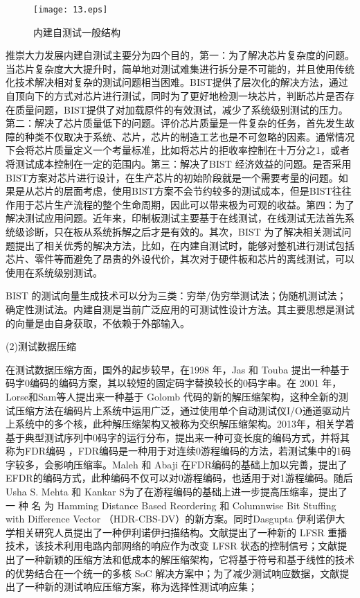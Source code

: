 \begin{figure}[H]
  \centering
  \texttt{[image: 13.eps]}
  \caption{内建自测试一般结构}\label{13}
     \end{figure}

推崇大力发展内建自测试主要分为四个目的，第一：为了解决芯片复杂度的问题。当芯片复杂度大大提升时，简单地对测试难集进行拆分是不可能的，并且使用传统化技术解决相对复杂的测试问题相当困难。BIST提供了层次化的解决方法，通过自顶向下的方式对芯片进行测试，同时为了更好地检测一块芯片，判断芯片是否存在质量问题，BIST提供了对加载原件的有效测试，减少了系统级别测试的压力。第二：解决了芯片质量低下的问题。评价芯片质量是一件复杂的任务，首先发生故障的种类不仅取决于系统、芯片，芯片的制造工艺也是不可忽略的因素。通常情况下会将芯片质量定义一个考量标准，比如将芯片的拒收率控制在十万分之1，或者将测试成本控制在一定的范围内。第三：解决了BIST 经济效益的问题。是否采用BIST方案对芯片进行设计，在生产芯片的初始阶段就是一个需要考量的问题。如果是从芯片的层面考虑，使用BIST方案不会节约较多的测试成本，但是BIST往往作用于芯片生产流程的整个生命周期，因此可以带来极为可观的收益。第四：为了解决测试应用问题。近年来，印制板测试主要基于在线测试，在线测试无法首先系统级诊断，只在板从系统拆解之后才是有效的。其次，BIST 为了解决相关测试问题提出了相关优秀的解决方法，比如，在内建自测试时，能够对整机进行测试包括芯片、零件等而避免了昂贵的外设代价，其次对于硬件板和芯片的离线测试，可以使用在系统级别测试。

BIST 的测试向量生成技术可以分为三类：穷举/伪穷举测试法；伪随机测试法；确定性测试法。内建自测是当前广泛应用的可测试性设计方法。其主要思想是测试的向量是由自身获取，不依赖于外部输入\cite{35}。

(2)测试数据压缩

在测试数据压缩方面，国外的起步较早，在1998 年，Jas 和 Touba 提出一种基于码字0编码的编码方案\cite{39}，其以较短的固定码字替换较长的0码字串。在 2001 年，Lorse和Sam等人提出来一种基于 Golomb 代码的新的解压缩架构，这种全新的测试压缩方法在编码片上系统中运用广泛，通过使用单个自动测试仪I/O通道驱动片上系统中的多个核，此种解压缩架构又被称为交织解压缩架构\cite{40}。2013年，相关学着基于典型测试序列中0码字的运行分布，提出来一种可变长度的编码方式，并将其称为FDR编码
\cite{41}，FDR编码是一种用于对连续0游程编码的方法，若测试集中的1码字较多，会影响压缩率。Maleh 和 Abaji 在FDR编码的基础上加以完善，提出了EFDR\cite{42}的编码方式，此种编码不仅可以对0游程编码，也适用于对1游程编码。随后Usha S. Mehta 和 Kankar S为了在游程编码的基础上进一步提高压缩率，提出了一 种 名 为 Hamming Distance Based Reordering 和 Columnwise Bit Stuffing with Difference Vector （HDR-CBS-DV）的新方案\cite{43}。同时Dasgupta 伊利诺伊大学相关研究人员提出了一种伊利诺伊扫描结构\cite{44}。文献\cite{45}提出了一种新的 LFSR 重播技术，该技术利用电路内部网络的响应作为改变 LFSR 状态的控制信号；文献\cite{46}提出了一种新颖的压缩方法和低成本的解压缩架构，它将基于符号和基于线性的技术的优势结合在一个统一的多核 SoC 解决方案中；为了减少测试响应数据，文献\cite{47}提出了一种新的测试响应压缩方案，称为选择性测试响应集；

